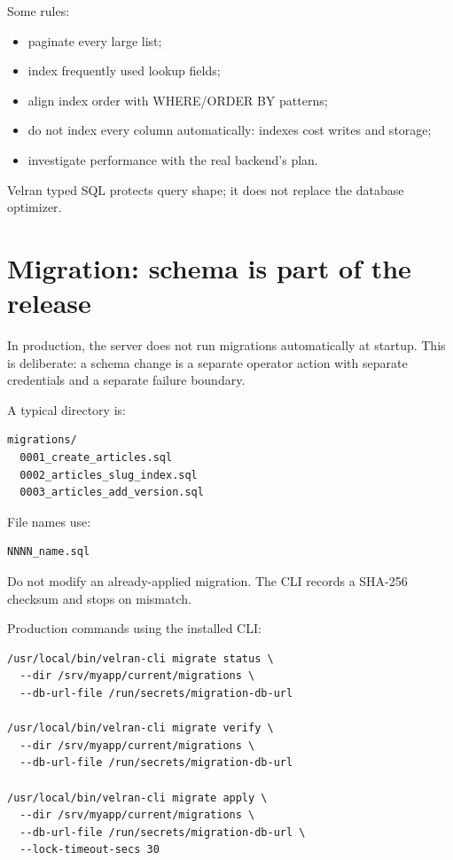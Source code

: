 Some rules:

\begin{itemize}
\item paginate every large list;
\item index frequently used lookup fields;
\item align index order with WHERE/ORDER BY patterns;
\item do not index every column automatically: indexes cost writes and storage;
\item investigate performance with the real backend's  plan.
\end{itemize}

Velran typed SQL protects query shape; it does not replace the database optimizer.

\section{Migration: schema is part of the release}

In production, the server does not run migrations automatically at startup. This is deliberate: a schema change is a separate operator action with separate credentials and a separate failure boundary.

A typical directory is:

\begin{lstlisting}
migrations/
  0001_create_articles.sql
  0002_articles_slug_index.sql
  0003_articles_add_version.sql
\end{lstlisting}

File names use:

\begin{lstlisting}
NNNN_name.sql
\end{lstlisting}

Do not modify an already-applied migration. The CLI records a SHA-256 checksum and stops on mismatch.

Production commands using the installed CLI:

\begin{lstlisting}
/usr/local/bin/velran-cli migrate status \
  --dir /srv/myapp/current/migrations \
  --db-url-file /run/secrets/migration-db-url

/usr/local/bin/velran-cli migrate verify \
  --dir /srv/myapp/current/migrations \
  --db-url-file /run/secrets/migration-db-url

/usr/local/bin/velran-cli migrate apply \
  --dir /srv/myapp/current/migrations \
  --db-url-file /run/secrets/migration-db-url \
  --lock-timeout-secs 30
\end{lstlisting}

